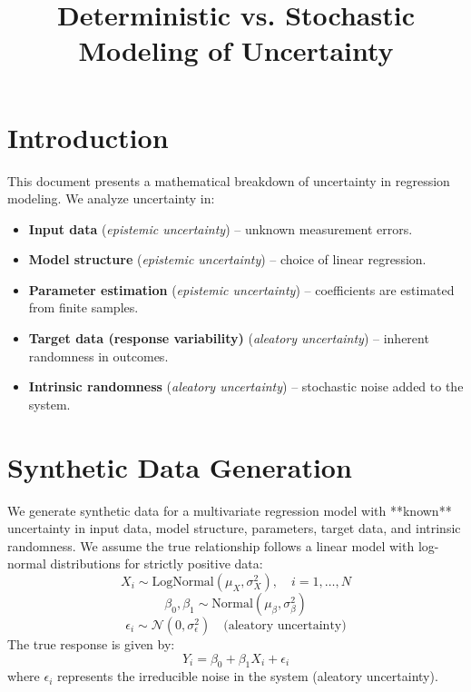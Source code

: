 \documentclass{article}
\title{Deterministic vs. Stochastic Modeling of Uncertainty}
\author{}
\date{}
\begin{document}
\maketitle

\section{Introduction}
This document presents a mathematical breakdown of uncertainty in regression modeling. We analyze uncertainty in:
\begin{itemize}
    \item \textbf{Input data} (\textit{epistemic uncertainty}) – unknown measurement errors.
    \item \textbf{Model structure} (\textit{epistemic uncertainty}) – choice of linear regression.
    \item \textbf{Parameter estimation} (\textit{epistemic uncertainty}) – coefficients are estimated from finite samples.
    \item \textbf{Target data (response variability)} (\textit{aleatory uncertainty}) – inherent randomness in outcomes.
    \item \textbf{Intrinsic randomness} (\textit{aleatory uncertainty}) – stochastic noise added to the system.
\end{itemize}

\section{Synthetic Data Generation}

We generate synthetic data for a multivariate regression model with **known** uncertainty in input data, model structure, parameters, target data, and intrinsic randomness. We assume the true relationship follows a linear model with log-normal distributions for strictly positive data:
\begin{equation}
    X_i \sim \text{LogNormal}(\mu_X, \sigma_X^2), \quad i = 1, \dots, N
\end{equation}
\begin{equation}
    \beta_0, \beta_1 \sim \text{Normal}(\mu_\beta, \sigma_\beta^2)
\end{equation}
\begin{equation}
    \epsilon_i \sim \mathcal{N}(0, \sigma_\epsilon^2) \quad \text{(aleatory uncertainty)}
\end{equation}
The true response is given by:
\begin{equation}
    Y_i = \beta_0 + \beta_1 X_i + \epsilon_i
\end{equation}
where \( \epsilon_i \) represents the irreducible noise in the system (aleatory uncertainty).
\end{document}
